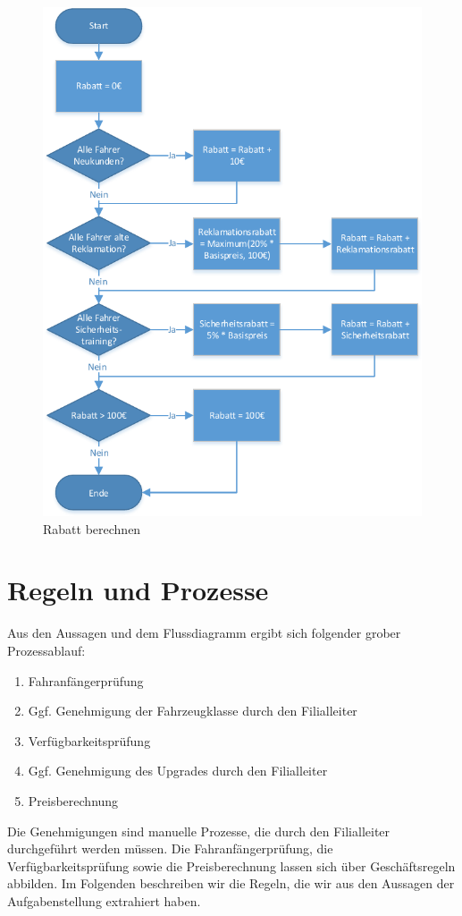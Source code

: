 \begin{figure}[H]
	\centering
	\includegraphics[width=0.8\linewidth]{Bilder/Rabatt_berechnen}
	\caption{Rabatt berechnen}
	\label{fig:Rabatt_berechnen}
\end{figure}

\section{Regeln und Prozesse}

Aus den Aussagen und dem Flussdiagramm ergibt sich folgender grober Prozessablauf:
\begin{enumerate}
	\item Fahranfängerprüfung
	\item Ggf. Genehmigung der Fahrzeugklasse durch den Filialleiter
	\item Verfügbarkeitsprüfung
	\item Ggf. Genehmigung des Upgrades durch den Filialleiter
	\item Preisberechnung
\end{enumerate}

Die Genehmigungen sind manuelle Prozesse, die durch den Filialleiter durchgeführt werden müssen.
Die Fahranfängerprüfung, die Verfügbarkeitsprüfung sowie die Preisberechnung lassen sich über
Geschäftsregeln abbilden. 
Im Folgenden beschreiben wir die Regeln, die wir aus den Aussagen der Aufgabenstellung
extrahiert haben.

